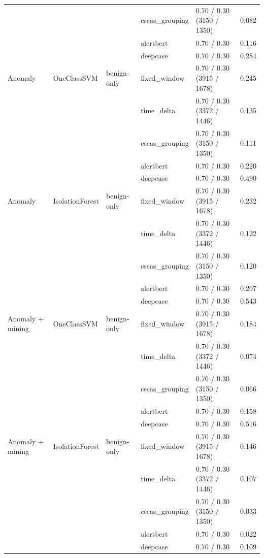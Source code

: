 \begin{table}[htbp]
{\begin{tabular}{lllllc}
 &  &  & cscas\_grouping & 0.70 / 0.30 (3150 / 1350) & 0.082 \\
 &  &  & alertbert & 0.70 / 0.30 & 0.116 \\
 &  &  & deepcase & 0.70 / 0.30 & 0.284 \\
\midrule
Anomaly & OneClassSVM & benign-only & fixed\_window & 0.70 / 0.30 (3915 / 1678) & 0.245 \\
 &  &  & time\_delta & 0.70 / 0.30 (3372 / 1446) & 0.135 \\
 &  &  & cscas\_grouping & 0.70 / 0.30 (3150 / 1350) & 0.111 \\
 &  &  & alertbert & 0.70 / 0.30 & 0.220 \\
 &  &  & deepcase & 0.70 / 0.30 & 0.490 \\
\addlinespace
Anomaly & IsolationForest & benign-only & fixed\_window & 0.70 / 0.30 (3915 / 1678) & 0.232 \\
 &  &  & time\_delta & 0.70 / 0.30 (3372 / 1446) & 0.122 \\
 &  &  & cscas\_grouping & 0.70 / 0.30 (3150 / 1350) & 0.120 \\
 &  &  & alertbert & 0.70 / 0.30 & 0.207 \\
 &  &  & deepcase & 0.70 / 0.30 & 0.543 \\
\addlinespace
Anomaly + mining & OneClassSVM & benign-only & fixed\_window & 0.70 / 0.30 (3915 / 1678) & 0.184 \\
 &  &  & time\_delta & 0.70 / 0.30 (3372 / 1446) & 0.074 \\
 &  &  & cscas\_grouping & 0.70 / 0.30 (3150 / 1350) & 0.066 \\
 &  &  & alertbert & 0.70 / 0.30 & 0.158 \\
 &  &  & deepcase & 0.70 / 0.30 & 0.516 \\
\addlinespace
Anomaly + mining & IsolationForest & benign-only & fixed\_window & 0.70 / 0.30 (3915 / 1678) & 0.146 \\
 &  &  & time\_delta & 0.70 / 0.30 (3372 / 1446) & 0.107 \\
 &  &  & cscas\_grouping & 0.70 / 0.30 (3150 / 1350) & 0.033 \\
 &  &  & alertbert & 0.70 / 0.30 & 0.022 \\
 &  &  & deepcase & 0.70 / 0.30 & 0.109 \\
\bottomrule
\end{tabular}%
}
\end{table}


